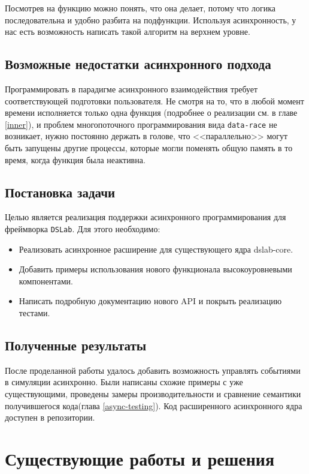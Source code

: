 Посмотрев на функцию можно понять, что она делает, потому что логика последовательна и удобно разбита на подфункции. Используя асинхронность, у нас есть возможность написать такой алгоритм на верхнем уровне. 

\subsection{Возможные недостатки асинхронного подхода}

Программировать в парадигме асинхронного взаимодействия требует соответствующей подготовки пользователя. Не смотря на то, что в любой момент времени исполняется только одна функция (подробнее о реализации см. в главе \ref{inner}), и проблем многопоточного программирования вида \texttt{data-race} не возникает, нужно постоянно держать в голове, что <<параллельно>> могут быть запущены другие процессы, которые могли поменять общую память в то время, когда функция была неактивна. 

\subsection{Постановка задачи}\label{main-purpose}
Целью является реализация поддержки асинхронного программирования для фреймворка \texttt{DSLab}. Для этого необходимо:
\begin{itemize}
    \item Реализовать асинхронное расширение для существующего ядра dslab-core.
    \item Добавить примеры использования нового функционала высокоуровневыми компонентами.
    \item Написать подробную документацию нового API и покрыть реализацию тестами.
\end{itemize}

\subsection{Полученные результаты}

После проделанной работы удалось добавить возможность управлять событиями в симуляции асинхронно. Были написаны схожие примеры с уже существующими, проведены замеры производительности и сравнение семантики получившегося кода(глава \ref{async-testing}). Код расширенного асинхронного ядра доступен в репозитории\cite{async-dslab-core}.


\section{Существующие работы и решения}

